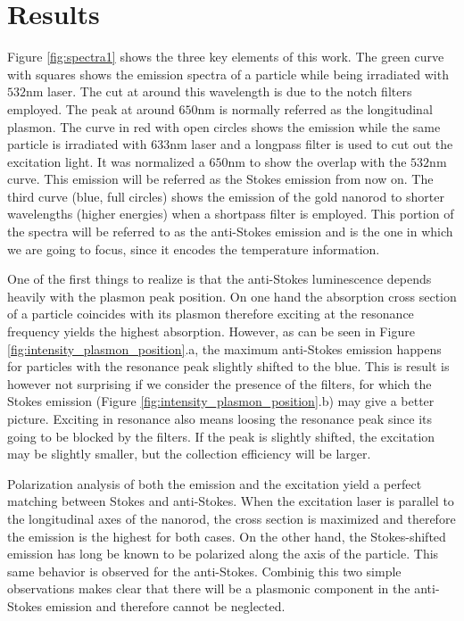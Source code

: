 \documentclass[twocolumn]{article}
\begin{document}
\section{Results}
Figure \ref{fig:spectra1} shows the three key elements of this work. The green
curve with squares shows the emission spectra of a particle while being
irradiated with $532$nm laser. The cut at around this wavelength is due to the
notch filters employed. The peak at around $650$nm is normally referred as the
longitudinal plasmon. The curve in red with open circles shows the emission
while the same particle is irradiated with $633$nm laser and a longpass filter
is used to cut out the excitation light. It was normalized a $650$nm to show the
overlap with the $532$nm curve. This emission will be referred as the Stokes
emission from now on. The third curve (blue, full circles) shows the emission of
the gold nanorod to shorter wavelengths (higher energies) when a shortpass
filter is employed. This portion of the spectra will be referred to as the
anti-Stokes emission and is the one in which we are going to focus, since it
encodes the temperature information. 

One of the first things to realize is that the anti-Stokes luminescence depends
heavily with the plasmon peak position. On one hand the absorption cross section
of a particle coincides with its plasmon therefore exciting at the resonance
frequency yields the highest absorption. However, as can be seen in Figure
\ref{fig:intensity_plasmon_position}.a, the maximum anti-Stokes emission happens
for particles with the resonance peak slightly shifted to the blue. This is
result is however not surprising if we consider the presence of the filters, for
which the Stokes emission (Figure \ref{fig:intensity_plasmon_position}.b) may
give a better picture. Exciting in resonance also means loosing the
resonance peak since its going to be blocked by the filters. If the peak is
slightly shifted, the excitation may be slightly smaller, but the collection
efficiency will be larger. 

Polarization analysis of both the emission and the excitation yield a perfect
matching between Stokes and anti-Stokes. When the excitation laser is parallel
to the longitudinal axes of the nanorod, the cross section is maximized and
therefore the emission is the highest for both cases. On the other hand, the
Stokes-shifted emission has long be known to be polarized along the axis of the
particle. This same behavior is observed for the anti-Stokes. Combinig this two
simple observations makes clear that there will be a plasmonic component in the
anti-Stokes emission and therefore cannot be neglected. 
\end{document}
